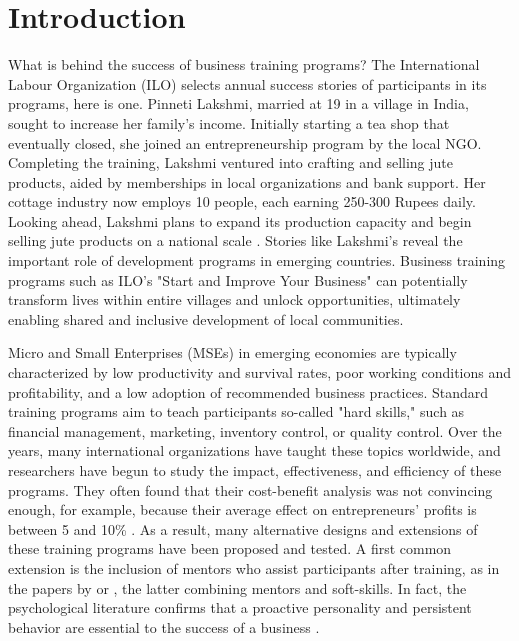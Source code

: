 \chapter{Introduction}

What is behind the success of business training programs? The International Labour Organization (ILO) selects annual success stories of participants in its programs, here is one. Pinneti Lakshmi, married at 19 in a village in India, sought to increase her family's income. Initially starting a tea shop that eventually closed, she joined an entrepreneurship program by the local NGO. Completing the training, Lakshmi ventured into crafting and selling jute products, aided by memberships in local organizations and bank support. Her cottage industry now employs 10 people, each earning 250-300 Rupees daily. Looking ahead, Lakshmi plans to expand its production capacity and begin selling jute products on a national scale \parencite{ILO2022}. Stories like Lakshmi's reveal the important role of development programs in emerging countries. Business training programs such as ILO's "Start and Improve Your Business" can potentially transform lives within entire villages and unlock opportunities, ultimately enabling shared and inclusive development of local communities.

Micro and Small Enterprises (MSEs) in emerging economies are typically characterized by low productivity and survival rates, poor working conditions and profitability, and a low adoption of recommended business practices. Standard training programs aim to teach participants so-called "hard skills," such as financial management, marketing, inventory control, or quality control. Over the years, many international organizations have taught these topics worldwide, and researchers have begun to study the impact, effectiveness, and efficiency of these programs. They often found that their cost-benefit analysis was not convincing enough, for example, because their average effect on entrepreneurs' profits is between 5 and 10\% \parencite{McKenzie2020}. As a result, many alternative designs and extensions of these training programs have been proposed and tested. A first common extension is the inclusion of mentors who assist participants after training, as in the papers by \cite{Bakhtiar2022} or \cite{Campos2017}, the latter combining mentors and soft-skills. In fact, the psychological literature confirms that a proactive personality and persistent behavior are essential to the success of a business \parencite{Frese2014}. 


